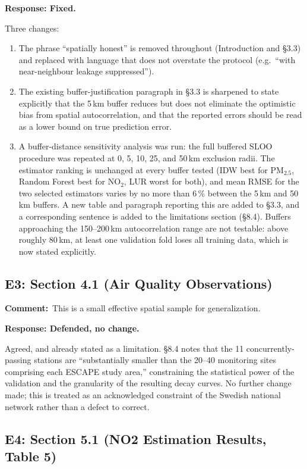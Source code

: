 \documentclass[11pt,a4paper]{article}
\newcommand{\rjcomment}[1]{\par\noindent\textbf{Comment:}\ #1\par}
\newcommand{\rjresponse}[1]{\par\noindent\textbf{Response: #1}\par}
\begin{document}
\rjresponse{Fixed.}
Three changes:
\begin{enumerate}[label=\arabic*.,leftmargin=*]
  \item The phrase ``spatially honest'' is removed throughout (Introduction and \S3.3) and
    replaced with language that does not overstate the protocol (e.g.\ ``with near-neighbour
    leakage suppressed'').
  \item The existing buffer-justification paragraph in \S3.3 is sharpened to state explicitly
    that the 5\,km buffer reduces but does not eliminate the optimistic bias from spatial
    autocorrelation, and that the reported errors should be read as a lower bound on true
    prediction error.
  \item A buffer-distance sensitivity analysis was run: the full buffered SLOO procedure was
    repeated at 0, 5, 10, 25, and 50\,km exclusion radii. The estimator ranking is unchanged at every
    buffer tested (IDW best for PM$_{2.5}$, Random Forest best for NO$_2$, LUR worst for both),
    and mean RMSE for the two selected estimators varies by no more than 6\,\% between the 5\,km
    and 50\,km buffers. A new table and paragraph reporting this are added to \S3.3, and a
    corresponding sentence is added to the limitations section (\S8.4). Buffers approaching the
    150--200\,km autocorrelation range are not testable: above roughly 80\,km, at least one
    validation fold loses all training data, which is now stated explicitly.
\end{enumerate}

\subsection{E3: Section 4.1 (Air Quality Observations)}

\rjcomment{This is a small effective spatial sample for generalization.}

\rjresponse{Defended, no change.}
Agreed, and already stated as a limitation. \S8.4 notes that the 11 concurrently-passing
stations are ``substantially smaller than the 20--40 monitoring sites comprising each ESCAPE
study area,'' constraining the statistical power of the validation and the granularity of the
resulting decay curves. No further change made; this is treated as an acknowledged constraint of
the Swedish national network rather than a defect to correct.

\subsection{E4: Section 5.1 (NO2 Estimation Results, Table 5)}
\end{document}

